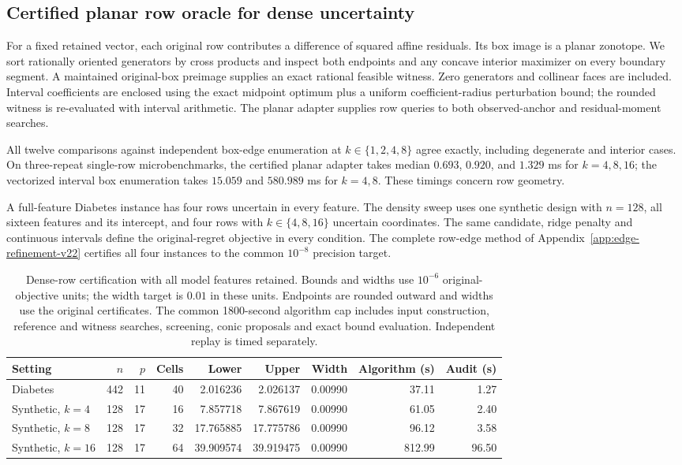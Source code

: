 \subsection{Certified planar row oracle for dense uncertainty}
For a fixed retained vector, each original row contributes a difference of squared affine residuals. Its box image is a planar zonotope. We sort rationally oriented generators by cross products and inspect both endpoints and any concave interior maximizer on every boundary segment. A maintained original-box preimage supplies an exact rational feasible witness. Zero generators and collinear faces are included. Interval coefficients are enclosed using the exact midpoint optimum plus a uniform coefficient-radius perturbation bound; the rounded witness is re-evaluated with interval arithmetic. The planar adapter supplies row queries to both observed-anchor and residual-moment searches.

All twelve comparisons against independent box-edge enumeration at $k\in\{1,2,4,8\}$ agree exactly, including degenerate and interior cases. On three-repeat single-row microbenchmarks, the certified planar adapter takes median $0.693$, $0.920$, and $1.329$ ms for $k=4,8,16$; the vectorized interval box enumeration takes $15.059$ and $580.989$ ms for $k=4,8$. These timings concern row geometry.

A full-feature Diabetes instance has four rows uncertain in every feature. The density sweep uses one synthetic design with $n=128$, all sixteen features and its intercept, and four rows with $k\in\{4,8,16\}$ uncertain coordinates. The same candidate, ridge penalty and continuous intervals define the original-regret objective in every condition. The complete row-edge method of Appendix~\ref{app:edge-refinement-v22} certifies all four instances to the common $10^{-8}$ precision target.

\begin{table}[t]\centering\small\setlength{\tabcolsep}{4pt}
\caption{Dense-row certification with all model features retained. Bounds and widths use $10^{-6}$ original-objective units; the width target is $0.01$ in these units. Endpoints are rounded outward and widths use the original certificates. The common 1800-second algorithm cap includes input construction, reference and witness searches, screening, conic proposals and exact bound evaluation. Independent replay is timed separately.}\label{tab:dense-edge-v22}
\begin{tabular}{lrrrrrrrr}\toprule Setting&$n$&$p$&Cells&Lower&Upper&Width&Algorithm (s)&Audit (s)\\\midrule
Diabetes & 442 & 11 & 40 & 2.016236 & 2.026137 & 0.00990 & 37.11 & 1.27\\
Synthetic, $k=4$ & 128 & 17 & 16 & 7.857718 & 7.867619 & 0.00990 & 61.05 & 2.40\\
Synthetic, $k=8$ & 128 & 17 & 32 & 17.765885 & 17.775786 & 0.00990 & 96.12 & 3.58\\
Synthetic, $k=16$ & 128 & 17 & 64 & 39.909574 & 39.919475 & 0.00990 & 812.99 & 96.50\\
\bottomrule\end{tabular}\end{table}


